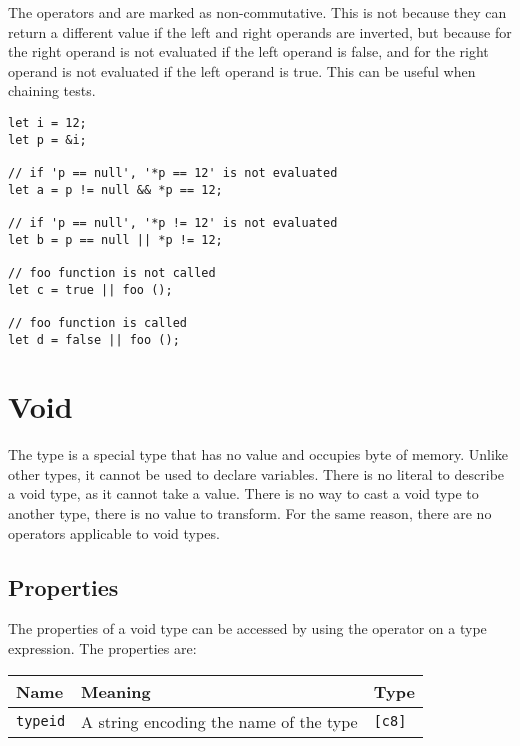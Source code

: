 \begin{itemize}
  The operators \token{\&\&} and \token{||} are marked as non-commutative. This
  is not because they can return a different value if the left and right operands
  are inverted, but because for \token{\&\&} the right operand is not evaluated
  if the left operand is false, and for \token{||} the right operand is not
  evaluated if the left operand is true. This can be useful when chaining tests.

  \begin{lstlisting}[style=coloredverbatim]
let i = 12;
let p = &i;

// if 'p == null', '*p == 12' is not evaluated
let a = p != null && *p == 12;

// if 'p == null', '*p != 12' is not evaluated
let b = p == null || *p != 12;

// foo function is not called
let c = true || foo ();

// foo function is called
let d = false || foo ();
  \end{lstlisting}
\end{itemize}

\section{Void}
\label{sec:org409c2d8}

The  type is a special type that has no value and occupies
 byte of memory. Unlike other types, it cannot be used to declare
variables. There is no literal to describe a void type, as it cannot take a
value. There is no way to cast a void type to another type, there is no value to
transform. For the same reason, there are no operators applicable to void types.

\subsection{Properties}
\label{sec:orgffa98ee}

The properties of a void type can be accessed by using the \token{::} operator
on a type expression. The properties are:

\begin{center}
  \begin{adjustbox}{max width=\linewidth}
    \begin{tabular}{|l|ll|}
      \hline
      Name & Meaning & Type\\[0pt]
      \hline
      \hline
      \texttt{typeid} & A string encoding the name of the type & \texttt{[c8]}\\[0pt]
      \hline
    \end{tabular}
  \end{adjustbox}
\end{center}
